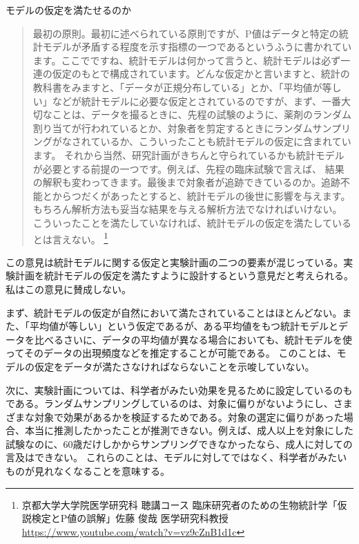 \begin{SMbox}{モデルの仮定を満たせるのか}
    \ 
    \begin{quote}
    最初の原則。最初に述べられている原則ですが、P値はデータと特定の統計モデルが矛盾する程度を示す指標の一つであるというふうに書かれています。ここでですね、統計モデルは何かって言うと、統計モデルは必ず一連の仮定のもとで構成されています。どんな仮定かと言いますと、統計の教科書をみますと、「データが正規分布している」とか、「平均値が等しい」などが統計モデルに必要な仮定とされているのですが、まず、一番大切なことは、データを撮るときに、先程の試験のように、薬剤のランダム割り当てが行われているとか、対象者を剪定するときにランダムサンプリングがなされているか、こういったことも統計モデルの仮定に含まれています。
    それから当然、研究計画がきちんと守られているかも統計モデルが必要とする前提の一つです。例えば、先程の臨床試験で言えば、
    結果の解釈も変わってきます。最後まで対象者が追跡できているのか。追跡不能とからつだくがあったとすると、統計モデルの後世に影響を与えます。もちろん解析方法も妥当な結果を与える解析方法でなければいけない。
    こういったことを満たしていなければ、統計モデルの仮定を満たしているとは言えない。
    \footnote{京都大学大学院医学研究科 聴講コース 臨床研究者のための生物統計学「仮説検定とP値の誤解」佐藤 俊哉 医学研究科教授 \url{https://www.youtube.com/watch?v=vz9cZnB1d1c} }
    \end{quote}

    この意見は統計モデルに関する仮定と実験計画の二つの要素が混じっている。実験計画を統計モデルの仮定を満たすように設計するという意見だと考えられる。
    私はこの意見に賛成しない。

     まず、統計モデルの仮定が自然において満たされていることはほとんどない。また、「平均値が等しい」という仮定であるが、ある平均値をもつ統計モデルとデータを比べるさいに、データの平均値が異なる場合においても、統計モデルを使ってそのデータの出現頻度などを推定することが可能である。
     このことは、モデルの仮定をデータが満たさなければならないことを示唆していない。

     次に、実験計画については、科学者がみたい効果を見るために設定しているのもである。ランダムサンプリングしているのは、対象に偏りがないようにし、さまざまな対象で効果があるかを検証するためである。対象の選定に偏りがあった場合、本当に推測したかったことが推測できない。例えば、成人以上を対象にした試験なのに、60歳だけしかからサンプリングできなかったなら、成人に対しての言及はできない。
     これらのことは、モデルに対してではなく、科学者がみたいものが見れなくなることを意味する。

\end{SMbox}

